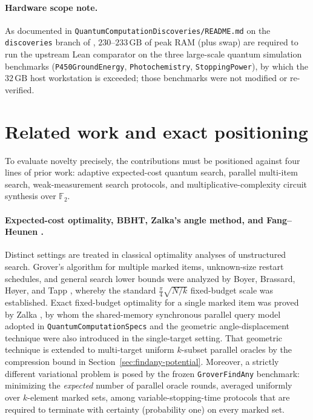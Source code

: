 \documentclass[11pt,a4paper]{article}
\theoremstyle{definition}
\theoremstyle{remark}
\begin{document}
\paragraph{Hardware scope note.} As documented in \texttt{QuantumComputationDiscoveries/README.md} on the \texttt{discoveries} branch of \cite{shirobokov2026}, \(230\text{--}233\,\mathrm{GB}\) of peak RAM (plus swap) are required to run the upstream Lean comparator on the three large-scale quantum simulation benchmarks (\texttt{P450Ground\allowbreak Energy}, \texttt{Photochemistry}, \texttt{StoppingPower}), by which the \(32\,\mathrm{GB}\) host workstation is exceeded; those benchmarks were not modified or re-verified.

\section{Related work and exact positioning}
\label{sec:related}

To evaluate novelty precisely, the contributions must be positioned against four lines of prior work: adaptive expected-cost quantum search, parallel multi-item search, weak-measurement search protocols, and multiplicative-complexity circuit synthesis over \(\mathbb{F}_2\).

\paragraph{Expected-cost optimality, BBHT, Zalka's angle method, and Fang--Heunen \cite{bbht1998,zalka1999,fang2026}.}
Distinct settings are treated in classical optimality analyses of unstructured search. Grover's algorithm for multiple marked items, unknown-size restart schedules, and general search lower bounds were analyzed by Boyer, Brassard, H{\o}yer, and Tapp \cite{bbht1998}, whereby the standard \(\frac{\pi}{4}\sqrt{N/k}\) fixed-budget scale was established. Exact fixed-budget optimality for a single marked item was proved by Zalka \cite{zalka1999}, by whom the shared-memory synchronous parallel query model adopted in \texttt{Quantum\allowbreak Computation\allowbreak Specs} and the geometric angle-displacement technique were also introduced in the single-target setting. That geometric technique is extended to multi-target uniform \(k\)-subset parallel oracles by the compression bound in Section~\ref{sec:findany-potential}. Moreover, a strictly different variational problem is posed by the frozen \texttt{GroverFindAny} benchmark: minimizing the \emph{expected} number of parallel oracle rounds, averaged uniformly over \(k\)-element marked sets, among variable-stopping-time protocols that are required to terminate with certainty (probability one) on every marked set.
\end{document}
